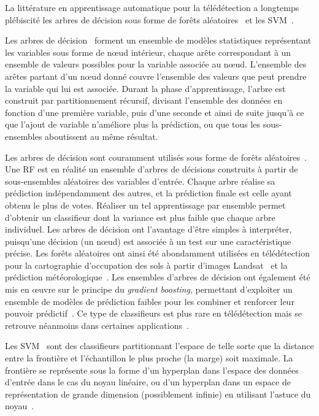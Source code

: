 La littérature en apprentissage automatique pour la télédétection a longtemps plébiscité les arbres de décision sous forme de forêts aléatoires~\cite{breiman_random_2001} et les \gls{SVM}~\cite{boser_training_1992,cortes_support-vector_1995}.

Les arbres de décision~\cite{breiman_classification_2017} forment un ensemble de modèles statistiques représentant les variables sous forme de n\oe{}ud intérieur, chaque arête correspondant à un ensemble de valeurs possibles pour la variable associée au n\oe{}ud. L'ensemble des arêtes partant d'un n\oe{}ud donné couvre l'ensemble des valeurs que peut prendre la variable qui lui est associée. Durant la phase d'apprentissage, l'arbre est construit par partitionnement récursif, divisant l'ensemble des données en fonction d'une première variable, puis d'une seconde et ainsi de suite jusqu'à ce que l'ajout de variable n'améliore plus la prédiction, ou que tous les sous-ensembles aboutissent au même résultat.

Les arbres de décision sont couramment utilisés sous forme de forêts aléatoires~\cite{breiman_random_2001}. Une \gls{RF} est en réalité un ensemble d'arbres de décisions construits à partir de sous-ensembles aléatoires des variables d'entrée. Chaque arbre réalise sa prédiction indépendamment des autres, et la prédiction finale est celle ayant obtenu le plus de votes. Réaliser un tel apprentissage par ensemble permet d'obtenir un classifieur dont la variance est plus faible que chaque arbre individuel. Les arbres de décision ont l'avantage d'être simples à interpréter, puisqu'une décision (un n\oe{}ud) est associée à un test sur une caractéristique précise. Les forêts aléatoires ont ainsi été abondamment utilisées en télédétection pour la cartographie d'occupation des sols à partir d'images \gls{Landsat}~\cite{pal_random_2005} et la prédiction météorologique~\cite{lary_machine_2016}. Les ensembles d'arbres de décision ont également été mis en \oe{}uvre sur le principe du \emph{gradient boosting}, permettant d'exploiter un ensemble de modèles de prédiction faibles pour les combiner et renforcer leur pouvoir prédictif~\cite{friedman_greedy_2001}. Ce type de classifieurs est plus rare en télédétection mais se retrouve néanmoins dans certaines applications~\cite{lawrence_classification_2004}.

Les \gls{SVM}~\cite{boser_training_1992,cortes_support-vector_1995} sont des classifieurs partitionnant l'espace de telle sorte que la distance entre la frontière et l'échantillon le plus proche (la marge) soit maximale. La frontière se représente sous la forme d'un hyperplan dans l'espace des données d'entrée dans le cas du noyau linéaire, ou d'un hyperplan dans un espace de représentation de grande dimension (possiblement infinie) en utilisant l'astuce du noyau~\cite{boser_training_1992}.

